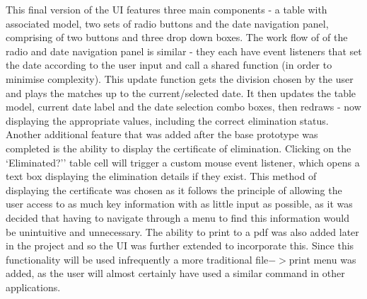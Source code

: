 This final version of the UI features three main components - a table with
associated model,  two sets of radio buttons and the date navigation panel,
comprising of two buttons and three drop down boxes. The work flow of of the
radio and date navigation panel is similar - they each have event listeners that
set the date according to the user input and call a shared function  (in order
to minimise complexity). This update function gets the division chosen by the
user and plays the matches up to the current/selected date. It then updates the
table  model, current date label and the date selection combo boxes, then
redraws - now displaying the  appropriate values, including the correct
elimination status. Another additional feature that was added after the base
prototype was completed is the ability to display the certificate of
elimination. Clicking on the `Eliminated?'' table cell will trigger a custom
mouse event listener, which opens a  text box displaying the elimination details
if they exist. This method of displaying the certificate was chosen as it
follows the principle of allowing the user access to as much key information
with as little input as possible, as it was decided that having to navigate
through a menu to find this  information would be unintuitive and unnecessary.
The ability to print to a pdf was also added later in the project and so the UI
was further extended to incorporate this. Since this functionality will be used
infrequently a more traditional file$-$$>$print menu was added, as the user will
almost certainly have used a similar command in other applications.
